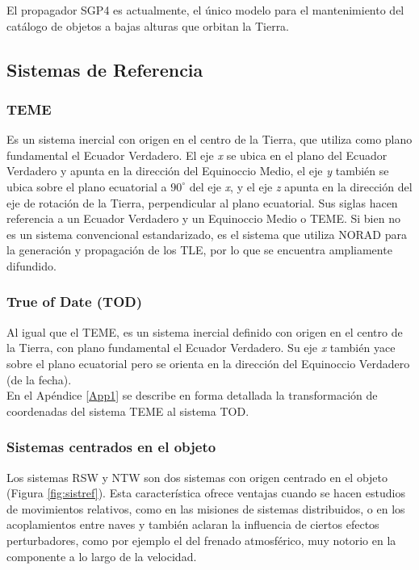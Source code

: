 {El propagador SGP4 es actualmente, el \'unico modelo para el mantenimiento del cat\'alogo de objetos a bajas alturas que orbitan la Tierra. 

\subsection{Sistemas de Referencia}\label{subsec:sistRef}

\subsubsection*{\ac{TEME}}
 Es un sistema inercial con origen en el centro de la Tierra, que utiliza como plano fundamental el Ecuador Verdadero. El eje {\it{x}} se ubica en el plano del Ecuador Verdadero y apunta en la direcci\'on del Equinoccio Medio, el eje {\it{y}} tambi\'en se ubica sobre el plano ecuatorial a $90^{\circ}$ del eje {\it{x}}, y el eje {\it{z}} apunta en la direcci\'on del eje de rotaci\'on de la Tierra, perpendicular al plano ecuatorial. Sus siglas hacen referencia a un Ecuador Verdadero y un Equinoccio Medio o \ac{TEME}. Si bien no es un sistema convencional estandarizado, es el sistema que utiliza NORAD para la generaci\'on y propagaci\'on de los TLE, por lo que se encuentra ampliamente difundido.
 
\subsubsection*{True of Date (TOD)}}
 Al igual que el TEME, es un sistema inercial definido con origen en el centro de la Tierra, con plano fundamental el Ecuador Verdadero. Su eje {\it{x}} tambi\'en yace sobre el plano ecuatorial pero se orienta en la direcci\'on del Equinoccio Verdadero (de la fecha).\\
 En el Ap\'endice \ref{App1} se describe en forma detallada la transformaci\'on de coordenadas del sistema TEME al sistema TOD.
 
\subsubsection*{Sistemas centrados en el objeto}
Los sistemas \ac{RSW} y \ac{NTW} son dos sistemas con origen centrado en el objeto (Figura \ref{fig:sistref}). Esta caracter\'istica ofrece ventajas cuando se hacen estudios de movimientos relativos, como en las misiones de sistemas distribuidos, o en los acoplamientos entre naves y tambi\'en aclaran la influencia de ciertos efectos perturbadores, como por ejemplo el del frenado atmosf\'erico, muy notorio en la componente a lo largo de la velocidad.\\

